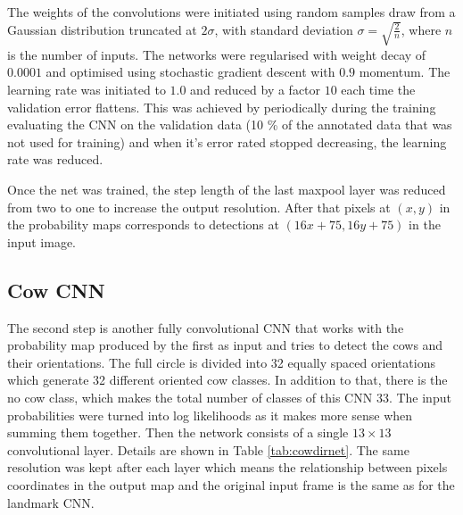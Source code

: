\documentclass{cta-author}
\begin{document}
The weights of the convolutions were initiated using random samples draw from a Gaussian
distribution truncated at $2\sigma$, with standard deviation $\sigma=\sqrt{\frac{2}{n}}$,
where $n$ is the number of inputs\cite{DBLP:journals/corr/HeZR015}. The networks were regularised with weight 
decay of
$0.0001$ and optimised using stochastic gradient descent with $0.9$ momentum. The
learning rate was initiated to $1.0$ and reduced by a factor $10$ each time the validation
error flattens. This was achieved by periodically during the training evaluating the CNN on the validation data 
(10 \% of the annotated data that was not used for training) and when it's error rated stopped decreasing, 
the learning rate was reduced.

Once the net was trained, the step length of the last maxpool layer was reduced from two to one to increase 
the output resolution. After that pixels at $\left(x, y\right)$ in the probability maps corresponds to 
detections at $\left(16 x + 75, 16 y + 75\right)$ in the input image.

\subsection{Cow CNN}

The second step is another fully convolutional CNN that works with the probability map produced by the first 
as input and tries to detect the cows and their orientations. The full circle is divided into 32 equally 
spaced orientations which generate 32 different oriented cow classes. In addition to that, there is the no 
cow class, which makes the total number of classes of this CNN 33. The input probabilities were turned into 
log likelihoods as it makes more sense when summing them together. Then the network consists of a single $ 13 
\times 13 $ convolutional layer. Details are shown in Table \ref{tab:cowdirnet}. The same resolution was kept 
after each layer which means the relationship between pixels coordinates in the output map and the original 
input frame is the same as for the landmark CNN.
\end{document}
